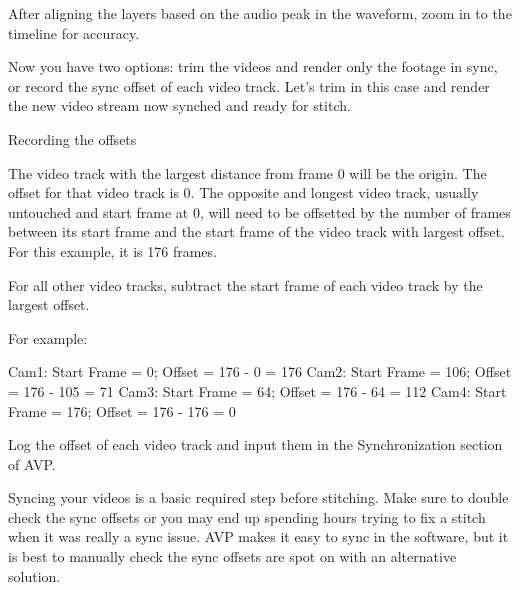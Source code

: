 \begin{fullwidth}
After aligning the layers based on the audio peak in the waveform, zoom in to the timeline for accuracy.

Now you have two options: trim the videos and render only the footage in sync, or record the sync offset of each video track. Let’s trim in this case and render the new video stream now synched and ready for stitch.

{\large Recording the offsets \par}

The video track with the largest distance from frame 0 will be the origin. The offset for that video track is 0. The opposite and longest video track, usually untouched and start frame at 0, will need to be offsetted by the number of frames between its start frame and the start frame of the video track with largest offset. For this example, it is 176 frames.

For all other video tracks, subtract the start frame of each video track by the largest offset. 

For example: 

Cam1: Start Frame = 0; Offset = 176 - 0 = 176
Cam2: Start Frame = 106; Offset = 176 - 105 = 71
Cam3: Start Frame = 64; Offset = 176 - 64 = 112
Cam4: Start Frame = 176; Offset = 176 - 176 = 0

Log the offset of each video track and input them in the Synchronization section of AVP.

Syncing your videos is a basic required step before stitching. Make sure to double check the sync offsets or you may end up spending hours trying to fix a stitch when it was really a sync issue. AVP makes it easy to sync in the software, but it is best to manually check the sync offsets are spot on with an alternative solution.


\clearpage
\end{fullwidth}